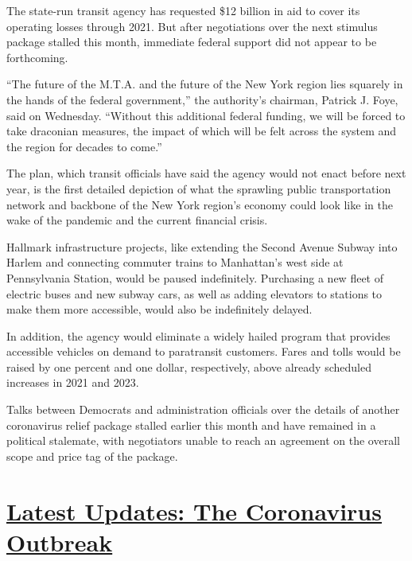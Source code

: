 The state-run transit agency has requested \$12 billion in aid to cover
its operating losses through 2021. But after negotiations over the next
stimulus package stalled this month, immediate federal support did not
appear to be forthcoming.

``The future of the M.T.A. and the future of the New York region lies
squarely in the hands of the federal government,'' the authority's
chairman, Patrick J. Foye, said on Wednesday. ``Without this additional
federal funding, we will be forced to take draconian measures, the
impact of which will be felt across the system and the region for
decades to come.''

The plan, which transit officials have said the agency would not enact
before next year, is the first detailed depiction of what the sprawling
public transportation network and backbone of the New York region's
economy could look like in the wake of the pandemic and the current
financial crisis.

Hallmark infrastructure projects, like extending the Second Avenue
Subway into Harlem and connecting commuter trains to Manhattan's west
side at Pennsylvania Station, would be paused indefinitely. Purchasing a
new fleet of electric buses and new subway cars, as well as adding
elevators to stations to make them more accessible, would also be
indefinitely delayed.

In addition, the agency would eliminate a widely hailed program that
provides accessible vehicles on demand to paratransit customers. Fares
and tolls would be raised by one percent and one dollar, respectively,
above already scheduled increases in 2021 and 2023.

Talks between Democrats and administration officials over the details of
another coronavirus relief package stalled earlier this month and have
remained in a political stalemate, with negotiators unable to reach an
agreement on the overall scope and price tag of the package.

\hypertarget{latest-updates-the-coronavirus-outbreak}{%
\section{\texorpdfstring{\href{https://www.nytimes3xbfgragh.onion/2020/09/11/world/covid-19-coronavirus.html?action=click\&pgtype=Article\&state=default\&region=MAIN_CONTENT_1\&context=storylines_live_updates}{Latest
Updates: The Coronavirus
Outbreak}}{Latest Updates: The Coronavirus Outbreak}}\label{latest-updates-the-coronavirus-outbreak}}

